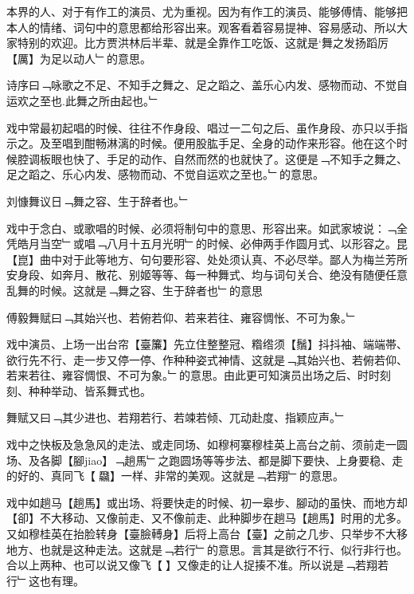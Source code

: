 \documentclass{zhvt-classic}
\begin{document}
本界的人、对于有作工的演员、尤为重视。因为有作工的演员、能够傅情、能够把本人的情绪、词句中的意思都给形容出来。观客看着容易提神、容易感动、所以大家特别的欢迎。比方贾洪林后半辈、就是全靠作工吃饭、这就是‘舞之发扬蹈厉【厲】为足以动人﹂的意思。

\begin{preface}
  诗序曰﹁咏歌之不足、不知手之舞之、足之蹈之、盖乐心内发、感物而动、不觉自运欢之至也.此舞之所由起也。﹂
\end{preface}

戏中常最初起唱的时候、往往不作身段、唱过一二句之后、虽作身段、亦只以手指示之。及至唱到酣畅淋漓的时候。便用股肱手足、全身的动作来形容。他在这个时候腔调板眼也快了、手足的动作、自然而然的也就快了。这便是﹁不知手之舞之、足之蹈之、乐心内发、感物而动、不觉自运欢之至也。﹂的意思。

\begin{preface}
  刘慷舞议日﹁舞之容、生于辞者也。﹂
\end{preface}

戏中于念白、或歌唱的时候、必须将制句中的意思、形容出来。如武家坡说：﹁全凭皓月当空﹂或唱﹁八月十五月光明﹂的时候、必伸两手作圆月式、以形容之。昆【崑】曲中对于此等地方、句句要形容、处处须认真、不必尽举。鄙人为梅兰芳所安身段、如奔月、散花、别姬等等、每一种舞式、均与词句关合、绝没有随便任意乱舞的时候。这就是﹁舞之容、生于辞者也﹂的意思

\begin{preface}
  傅毅舞赋曰﹁其始兴也、若俯若仰、若来若往、雍容惆怅、不可为象。﹂
\end{preface}

戏中演员、上场一出台帘【臺簾】先立住整整冠、糌绺须【鬚】抖抖袖、端端帯、欲行先不行、走一步又停一停、作种种姿式神情、这就是﹁其始兴也、若俯若仰、若来若往、雍容惆恨、不可为象。﹂的意思。由此更可知演员出场之后、时时刻刻、种种举动、皆系舞式也。

\begin{preface}
  舞赋又曰﹁其少进也、若翔若行、若竦若倾、兀动赴度、指颖应声。﹂
\end{preface}

戏中之快板及急急风的走法、或走同场、如穆柯寨穆桂英上高台之前、须前走一圆场、及各脚【腳jiao】﹁趟馬﹂之跑圆场等等步法、都是脚下要快、上身要稳、走的好的、真同飞【𮸽飝】一样、非常的美观。这就是﹁若翔﹂的意思。

戏中如趟马【趟馬】或出场、将要快走的时候、初一皋步、腳动的虽快、而地方却【卻】不大移动、又像前走、又不像前走、此种脚步在趟马【趟馬】时用的尤多。又如穆桂英在抬脸转身【臺臉𨍭身】后将上高台【臺】之前之几步、只举步不大移地方、也就是这种走法。这就是﹁若行﹂的意思。言其是欲行不行、似行非行也。合以上两种、也可以说又像飞【𮸽】又像走的让人捉揍不准。所以说是﹁若翔若行﹂这也有理。
\end{document}
